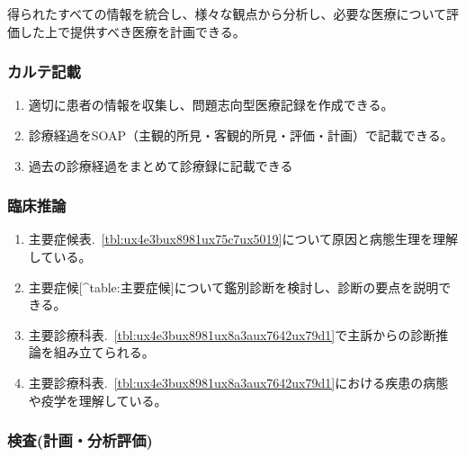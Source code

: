 \documentclass[
]{ltjsarticle}
\providecommand{\tightlist}{%
  \setlength{\itemsep}{0pt}\setlength{\parskip}{0pt}}
\begin{document}
得られたすべての情報を統合し、様々な観点から分析し、必要な医療について評価した上で提供すべき医療を計画できる。

\hypertarget{ux30abux30ebux30c6ux8a18ux8f09}{%
\subsubsection{カルテ記載}\label{ux30abux30ebux30c6ux8a18ux8f09}}

\begin{enumerate}
\def\labelenumi{\arabic{enumi}.}
\tightlist
\item
  適切に患者の情報を収集し、問題志向型医療記録を作成できる。
\item
  診療経過をSOAP（主観的所見・客観的所見・評価・計画）で記載できる。
\item
  過去の診療経過をまとめて診療録に記載できる
\end{enumerate}

\hypertarget{ux81e8ux5e8aux63a8ux8ad6}{%
\subsubsection{臨床推論}\label{ux81e8ux5e8aux63a8ux8ad6}}

\begin{enumerate}
\def\labelenumi{\arabic{enumi}.}
\tightlist
\item
  主要症候表.~\ref{tbl:ux4e3bux8981ux75c7ux5019}について原因と病態生理を理解している。
\item
  主要症候{[}\^{}table:主要症候{]}について鑑別診断を検討し、診断の要点を説明できる。
\item
  主要診療科表.~\ref{tbl:ux4e3bux8981ux8a3aux7642ux79d1}で主訴からの診断推論を組み立てられる。
\item
  主要診療科表.~\ref{tbl:ux4e3bux8981ux8a3aux7642ux79d1}における疾患の病態や疫学を理解している。
\end{enumerate}

\hypertarget{ux691cux67fbux8a08ux753bux5206ux6790ux8a55ux4fa1}{%
\subsubsection{検査(計画・分析評価)}\label{ux691cux67fbux8a08ux753bux5206ux6790ux8a55ux4fa1}}
\end{document}
